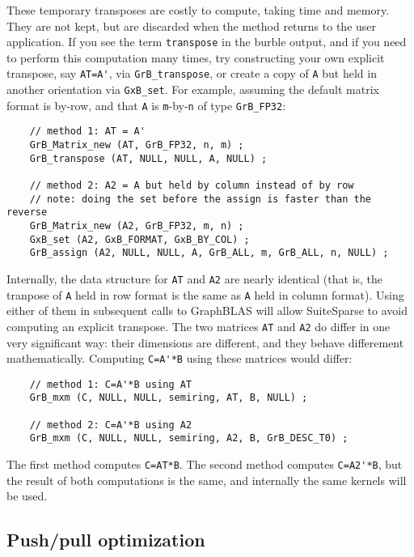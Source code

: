 \documentclass[12pt]{article}
\begin{document}
These temporary transposes are costly to compute, taking time and memory.  They
are not kept, but are discarded when the method returns to the user
application.  If you see the term \verb'transpose' in the burble output, and if
you need to perform this computation many times, try constructing your own
explicit transpose, say \verb"AT=A'", via \verb'GrB_transpose', or create a
copy of \verb'A' but held in another orientation via \verb'GxB_set'.  For
example, assuming the default matrix format is by-row, and that \verb'A' is
\verb'm'-by-\verb'n' of type \verb'GrB_FP32':

    {\scriptsize
    \begin{verbatim}
    // method 1: AT = A'
    GrB_Matrix_new (AT, GrB_FP32, n, m) ;
    GrB_transpose (AT, NULL, NULL, A, NULL) ;

    // method 2: A2 = A but held by column instead of by row
    // note: doing the set before the assign is faster than the reverse
    GrB_Matrix_new (A2, GrB_FP32, m, n) ;
    GxB_set (A2, GxB_FORMAT, GxB_BY_COL) ;
    GrB_assign (A2, NULL, NULL, A, GrB_ALL, m, GrB_ALL, n, NULL) ; \end{verbatim}}

Internally, the data structure for \verb'AT' and \verb'A2' are nearly identical
(that is, the tranpose of \verb'A' held in row format is the same as \verb'A'
held in column format).  Using either of them in subsequent calls to GraphBLAS
will allow SuiteSparse to avoid computing an explicit transpose.  The two
matrices \verb'AT' and \verb'A2' do differ in one very significant way:  their
dimensions are different, and they behave differement mathematically.
Computing \verb"C=A'*B" using these matrices would differ:

    {\scriptsize
    \begin{verbatim}
    // method 1: C=A'*B using AT
    GrB_mxm (C, NULL, NULL, semiring, AT, B, NULL) ;

    // method 2: C=A'*B using A2
    GrB_mxm (C, NULL, NULL, semiring, A2, B, GrB_DESC_T0) ; \end{verbatim}}

The first method computes \verb'C=AT*B'.  The second method computes
\verb"C=A2'*B", but the result of both computations is the same, and internally
the same kernels will be used.

\subsection{Push/pull optimization}
\end{document}
